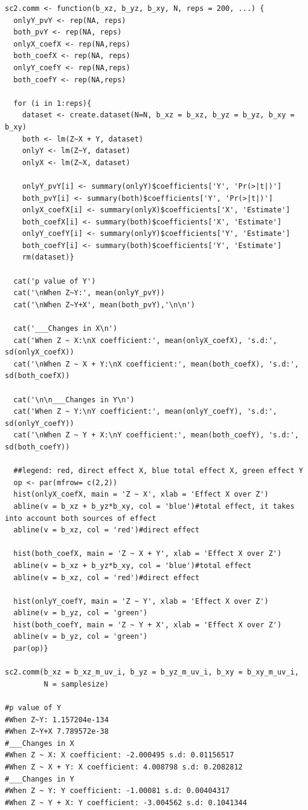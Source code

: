 \documentclass{article}
\begin{document}
\begin{lstlisting}
sc2.comm <- function(b_xz, b_yz, b_xy, N, reps = 200, ...) {
  onlyY_pvY <- rep(NA, reps)
  both_pvY <- rep(NA, reps)
  onlyX_coefX <- rep(NA,reps)
  both_coefX <- rep(NA, reps)
  onlyY_coefY <- rep(NA,reps)
  both_coefY <- rep(NA,reps)
  
  for (i in 1:reps){
    dataset <- create.dataset(N=N, b_xz = b_xz, b_yz = b_yz, b_xy = b_xy)
    both <- lm(Z~X + Y, dataset)
    onlyY <- lm(Z~Y, dataset)
    onlyX <- lm(Z~X, dataset)
    
    onlyY_pvY[i] <- summary(onlyY)$coefficients['Y', 'Pr(>|t|)']
    both_pvY[i] <- summary(both)$coefficients['Y', 'Pr(>|t|)']
    onlyX_coefX[i] <- summary(onlyX)$coefficients['X', 'Estimate']
    both_coefX[i] <- summary(both)$coefficients['X', 'Estimate']
    onlyY_coefY[i] <- summary(onlyY)$coefficients['Y', 'Estimate']
    both_coefY[i] <- summary(both)$coefficients['Y', 'Estimate']
    rm(dataset)}
  
  cat('p value of Y')
  cat('\nWhen Z~Y:', mean(onlyY_pvY))
  cat('\nWhen Z~Y+X', mean(both_pvY),'\n\n')
  
  cat('___Changes in X\n')
  cat('When Z ~ X:\nX coefficient:', mean(onlyX_coefX), 's.d:', sd(onlyX_coefX))
  cat('\nWhen Z ~ X + Y:\nX coefficient:', mean(both_coefX), 's.d:', sd(both_coefX))
  
  cat('\n\n___Changes in Y\n')
  cat('When Z ~ Y:\nY coefficient:', mean(onlyY_coefY), 's.d:', sd(onlyY_coefY))
  cat('\nWhen Z ~ Y + X:\nY coefficient:', mean(both_coefY), 's.d:', sd(both_coefY))
  
  ##legend: red, direct effect X, blue total effect X, green effect Y
  op <- par(mfrow= c(2,2))
  hist(onlyX_coefX, main = 'Z ~ X', xlab = 'Effect X over Z')
  abline(v = b_xz + b_yz*b_xy, col = 'blue')#total effect, it takes into account both sources of effect
  abline(v = b_xz, col = 'red')#direct effect
  
  hist(both_coefX, main = 'Z ~ X + Y', xlab = 'Effect X over Z')
  abline(v = b_xz + b_yz*b_xy, col = 'blue')#total effect
  abline(v = b_xz, col = 'red')#direct effect
  
  hist(onlyY_coefY, main = 'Z ~ Y', xlab = 'Effect X over Z')
  abline(v = b_yz, col = 'green')
  hist(both_coefY, main = 'Z ~ Y + X', xlab = 'Effect X over Z')
  abline(v = b_yz, col = 'green') 
  par(op)}

sc2.comm(b_xz = b_xz_m_uv_i, b_yz = b_yz_m_uv_i, b_xy = b_xy_m_uv_i,
         N = samplesize)

#p value of Y
#When Z~Y: 1.157204e-134
#When Z~Y+X 7.789572e-38 
#___Changes in X
#When Z ~ X: X coefficient: -2.000495 s.d: 0.01156517
#When Z ~ X + Y: X coefficient: 4.008798 s.d: 0.2082812
#___Changes in Y
#When Z ~ Y: Y coefficient: -1.00081 s.d: 0.00404317
#When Z ~ Y + X: Y coefficient: -3.004562 s.d: 0.1041344
\end{lstlisting}
\end{document}
